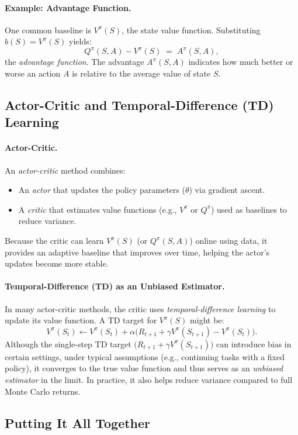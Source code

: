 \paragraph{Example: Advantage Function.}
One common baseline is \(V^\pi(S)\), the state value function. Substituting \(b(S) = V^\pi(S)\) yields:
\[
  Q^\pi(S,A) - V^\pi(S) 
  \;=\;
  A^\pi(S,A),
\]
the \emph{advantage function}. The advantage \(A^\pi(S,A)\) indicates how much better or worse an action \(A\) is relative to the average value of state \(S\).

\subsection{Actor-Critic and Temporal-Difference (TD) Learning}

\paragraph{Actor-Critic.}
An \emph{actor-critic} method combines:
\begin{itemize}
    \item An \emph{actor} that updates the policy parameters (\(\theta\)) via gradient ascent.
    \item A \emph{critic} that estimates value functions (e.g., \(V^\pi\) or \(Q^\pi\)) used as baselines to reduce variance.
\end{itemize}
Because the critic can learn \(V^\pi(S)\) (or \(Q^\pi(S,A)\)) online using data, it provides an adaptive baseline that improves over time, helping the actor’s updates become more stable.

\paragraph{Temporal-Difference (TD) as an Unbiased Estimator.}
In many actor-critic methods, the critic uses \emph{temporal-difference learning} to update its value function. A TD target for \(V^\pi(S)\) might be:
\[
  V^\pi(S_t) 
  \leftarrow 
  V^\pi(S_t) + \alpha \bigl(R_{t+1} + \gamma V^\pi(S_{t+1}) - V^\pi(S_t)\bigr).
\]
Although the single-step TD target \(\bigl(R_{t+1} + \gamma V^\pi(S_{t+1})\bigr)\) can introduce bias in certain settings, under typical assumptions (e.g., continuing tasks with a fixed policy), it converges to the true value function and thus serves as an \emph{unbiased estimator} in the limit. In practice, it also helps reduce variance compared to full Monte Carlo returns.

\subsection{Putting It All Together}

